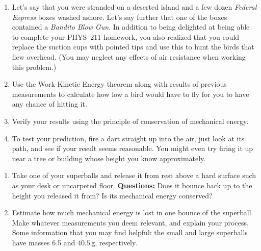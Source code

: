 \begin{exercise}
  \begin{enumerate}
  \item Let's say that you were stranded on a deserted island and a
    few dozen \emph{Federal Express} boxes washed ashore.  Let's say
    further that one of the boxes contained a \emph{Bandito Blow Gun}.
    In addition to being delighted at being able to complete your
    PHYS~211 homework, you also realized that you could replace the
    suction cups with pointed tips and use this to hunt the birds that
    flew overhead.  (You may neglect any effects of air resistance when 
    working this problem.)
  \item Use the Work-Kinetic Energy theorem along with results 
    of previous measurements to calculate how low a bird would have 
    to fly for you to have any chance of hitting it.
  \item Verify your results using the principle of conservation of
    mechanical energy.
  \item To test your prediction, fire a dart straight up into the air,
    just look at its path, and see if your result seems reasonable.
    You might even try firing it up near a tree or building whose
    height you know approximately.
  \end{enumerate}
\end{exercise}

\begin{exercise}
  \begin{enumerate}
  \item Take one of your superballs and release it from rest above a
    hard surface such as your desk or uncarpeted floor.  \textbf{      Questions:} Does it bounce back up to the height you released it
    from?  Is its mechanical energy conserved?

  \item Estimate how much mechanical energy is lost in one bounce of
    the superball.  Make whatever measurements you deem relevant, and
    explain your process.  Some information that you may find helpful:
    the small and large superballs have masses 6.5 and $40.5\,
    \mbox{g}$, respectively.

  \end{enumerate}
\end{exercise}

